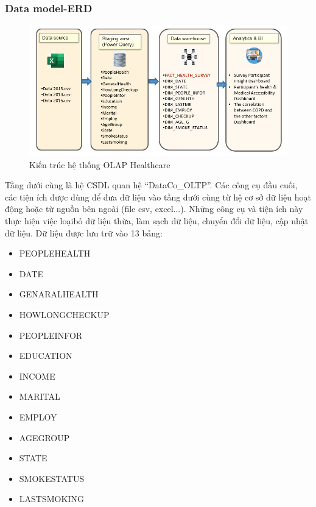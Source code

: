 \subsubsection{Data model-ERD}
\begin{center}
            \begin{figure}[!h]
                \centering
                \includegraphics[scale = 0.4]{van/oltp healthcare.png}
              \caption{Kiến trúc hệ thống OLAP Healthcare}
            \end{figure}
    \end{center}
    Tầng dưới cùng là hệ CSDL quan hệ “DataCo\_OLTP”. Các công cụ đầu cuối, các tiện ích được dùng để đưa dữ liệu vào tầng dưới cùng từ hệ cơ sở dữ liệu hoạt động hoặc từ nguồn bên ngoài (file csv, excel...). Những công cụ và tiện ích này thực hiện việc loạibỏ dữ liệu thừa, làm sạch dữ liệu, chuyển đổi dữ liệu, cập nhật dữ liệu. Dữ liệu được lưu trữ vào 13 bảng: 
    
\begin{itemize}
    \item PEOPLEHEALTH
    \item DATE
    \item GENARALHEALTH
    \item HOWLONGCHECKUP
    \item PEOPLEINFOR
    \item EDUCATION
    \item INCOME
    \item MARITAL
    \item EMPLOY
    \item AGEGROUP
    \item STATE
    \item SMOKESTATUS
    \item LASTSMOKING
\end{itemize}

